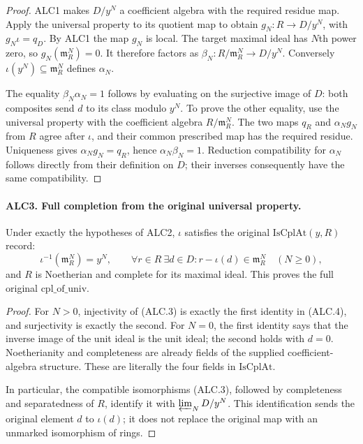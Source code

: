 \documentclass[11pt,a4paper]{article}
\numberwithin{equation}{section}
\theoremstyle{remark}\newtheorem{remark}[theorem]{Remark}
\begin{document}
\begin{proof}
ALC1 makes \(D/y^N\) a coefficient algebra with the required
residue map.  Apply the universal property to its quotient map
to obtain \(g_N:R\to D/y^N\), with
\(g_N\iota=q_D\).  By ALC1 the map \(g_N\) is local.
The target maximal ideal has \(N\)th power zero, so
\(g_N(\mathfrak m_R^N)=0\).  It therefore factors as
\(\beta_N:R/\mathfrak m_R^N\to D/y^N\).
Conversely \(\iota(y^N)\subseteq\mathfrak m_R^N\) defines
\(\alpha_N\).

The equality \(\beta_N\alpha_N=1\) follows by evaluating on
the surjective image of \(D\): both composites send \(d\)
to its class modulo \(y^N\).  To prove the other equality,
use the universal property with the coefficient algebra
\(R/\mathfrak m_R^N\).  The two maps
\(q_R\) and \(\alpha_Ng_N\) from \(R\) agree after
\(\iota\), and their common prescribed map has the required
residue.  Uniqueness gives \(\alpha_Ng_N=q_R\), hence
\(\alpha_N\beta_N=1\).  Reduction compatibility for
\(\alpha_N\) follows directly from their definition on \(D\);
their inverses consequently have the same compatibility.
\end{proof}

\paragraph{ALC3. Full completion from the original universal property.}
\label{claim:ALC3}
Under exactly the hypotheses of ALC2, \(\iota\) satisfies the
original \(\mathrm{IsCplAt}(y,R)\) record:
\[
 \iota^{-1}(\mathfrak m_R^N)=y^N,
 \qquad
 \forall r\in R\ \exists d\in D:
           r-\iota(d)\in\mathfrak m_R^N
                     \quad(N\ge0),                  \tag{ALC.4}
\]
and \(R\) is Noetherian and complete for its maximal ideal.
This proves the full original \(\mathrm{cpl\_\allowbreak of\_\allowbreak univ}\).

\begin{proof}
For \(N>0\), injectivity of (ALC.3) is exactly the first
identity in (ALC.4), and surjectivity is exactly the second.
For \(N=0\), the first identity says that the inverse image
of the unit ideal is the unit ideal; the second holds with
\(d=0\).  Noetherianity and completeness are already fields
of the supplied coefficient-algebra structure.  These are
literally the four fields in \(\mathrm{IsCplAt}\).

In particular, the compatible isomorphisms (ALC.3), followed
by completeness and separatedness of \(R\), identify it with
\(\varprojlim_N D/y^N\).  This identification sends the
original element \(d\) to \(\iota(d)\); it does not replace
the original map with an unmarked isomorphism of rings.
\end{proof}
\end{document}
